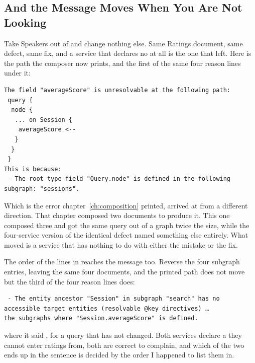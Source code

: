 \subsection{And the Message Moves When You Are Not Looking}

%
Take Speakers out of  and change nothing else. Same Ratings
document, same defect, same fix, and a service that declares no 
at all is the one that left. Here is the path the composer now prints, and the
first of the same four reason lines under it:

\begin{verbatim}
The field "averageScore" is unresolvable at the following path:
 query {
  node {
   ... on Session {
    averageScore <--
   }
  }
 }
This is because:
 - The root type field "Query.node" is defined in the following subgraph: "sessions".
\end{verbatim}

%
Which is the error chapter~\ref{ch:composition} printed, arrived at from a
different direction. That chapter composed two documents to produce it. This
one composed three and got the same query out of a graph twice the size, while
the four-service version of the identical defect named something else entirely.
What moved is a service that has nothing to do with either the mistake or the
fix.

%
The order of the lines in  reaches the message too. Reverse
the four subgraph entries, leaving the same four documents, and the printed
path does not move but the third of the four reason lines does:

\begin{verbatim}
 - The entity ancestor "Session" in subgraph "search" has no accessible target entities (resolvable @key directives) …
the subgraphs where "Session.averageScore" is defined.
\end{verbatim}

%
 where it said , for a query that has not changed.
Both services declare a  they cannot enter ratings from, both are
correct to complain, and which of the two ends up in the sentence is decided by
the order I happened to list them in.

